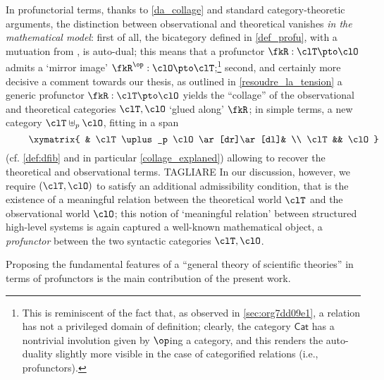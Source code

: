In profunctorial terms, thanks to \autoref{da_collage} and standard category\hyp{}theoretic arguments, the distinction between observational and theoretical vanishes \emph{in the mathematical model}: first of all, the bicategory defined in \autoref{def_profu}, with a mutuation from \cite{benabou2000distributors}, is auto-dual; this means that a profunctor $\fkR : \clT \pto \clO$ admits a `mirror image' $\fkR^\op : \clO \pto \clT$;\footnote{This is reminiscent of the fact that, as observed in \autoref{sec:org7dd09e1}, a relation has not a privileged domain of definition; clearly, the category $\mathsf{Cat}$ has a nontrivial involution given by $\op$ing a category, and this renders the auto-duality slightly more visible in the case of categorified relations (i.e., profunctors).} second, and certainly more decisive a comment towards our thesis, as outlined in \autoref{resoudre_la_tension} a generic profunctor $\fkR : \clT \pto\clO$ yields the ``collage'' of the observational and theoretical categories $\clT,\clO$ `glued along' $\fkR$; in simple terms, a new category $\clT\uplus_p\clO$, fitting in a span 
\[ \vcenter{\xymatrix{
	& \clT\uplus_p \clO \ar[dr]\ar[dl]& \\ 
	\clT  && \clO 
}} \] (cf. \autoref{def:dfib} and in particular \autoref{collage_explaned}) allowing to recover the theoretical and observational terms.
TAGLIARE
\color{blue!40}
In our discussion, however, we require $(\clT,\clO)$ to satisfy an additional admissibility condition, that is the existence of a meaningful relation between the theoretical world $\clT$ and the observational world $\clO$; this notion of `meaningful relation' between structured high-level systems is again captured a well-known mathematical object, a \emph{profunctor} \cite{benabou2000distributors} between the two syntactic categories $\clT,\clO$.

Proposing the fundamental features of a ``general theory of scientific theories'' in terms of profunctors is the main contribution of the present work.

